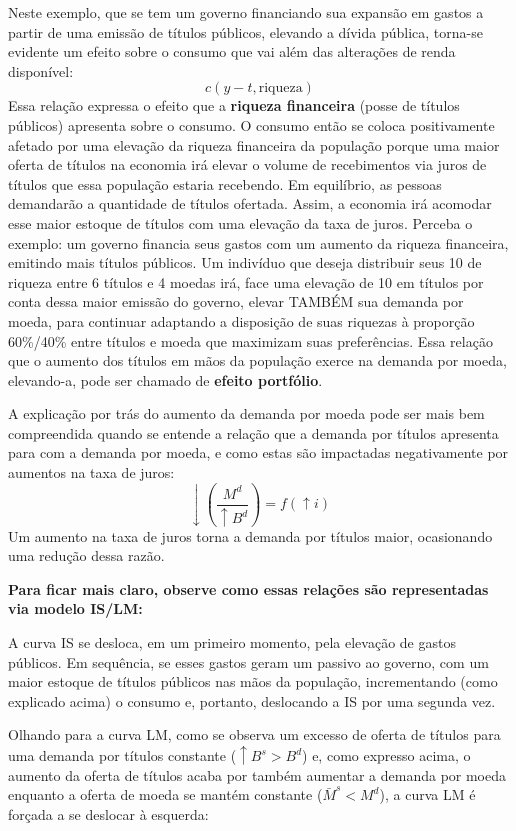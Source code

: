 \documentclass[a4paper,12pt]{article}[abntex2]
\begin{document}
Neste exemplo, que se tem um governo financiando sua expansão em gastos a partir de uma emissão de títulos públicos, elevando a dívida pública, torna-se evidente um efeito sobre o consumo que vai além das alterações de renda disponível:  
\[
c(y - t, \text{riqueza})
\]
Essa relação expressa o efeito que a \textbf{riqueza financeira} (posse de títulos públicos) apresenta sobre o consumo. O consumo então se coloca positivamente afetado por uma elevação da riqueza financeira da população porque uma maior oferta de títulos na economia irá elevar o volume  de  recebimentos  via  juros  de  títulos  que  essa  população  estaria  recebendo.  Em equilíbrio, as pessoas demandarão a quantidade de títulos ofertada. Assim, a economia irá acomodar esse maior estoque de títulos com uma elevação da taxa de juros. Perceba o exemplo: um governo financia seus gastos com um aumento da riqueza financeira, emitindo mais títulos públicos. Um indivíduo que deseja distribuir seus 10 de riqueza entre 6 títulos e 4 moedas irá, face uma elevação de 10 em títulos por conta dessa maior emissão do governo, elevar TAMBÉM sua demanda por moeda, para continuar adaptando a disposição de suas riquezas à proporção 60\%/40\% entre títulos e moeda que maximizam suas preferências. Essa relação que o aumento dos títulos em mãos da população exerce na demanda por moeda, elevando-a, pode ser chamado de \textbf{efeito portfólio}.

A explicação por trás do aumento da demanda por moeda pode ser mais bem compreendida quando se entende a relação que a demanda por títulos apresenta para com a demanda por moeda, e como estas são impactadas negativamente por aumentos na taxa de juros:
\[
\downarrow\left( \frac{M^d}{\uparrow B^d} \right) = f(\uparrow i)
\]
Um aumento na taxa de juros torna a demanda por títulos maior, ocasionando uma redução dessa razão. 

\textbf{Para ficar mais claro, observe como essas relações são representadas via modelo IS/LM:}

A curva IS se desloca, em um primeiro momento, pela elevação de gastos públicos. Em sequência, se esses gastos geram um passivo ao governo, com um maior estoque de títulos públicos nas mãos da população, incrementando (como explicado acima) o consumo e, portanto, deslocando a IS por uma segunda vez.

Olhando para a curva LM, como se observa um excesso de oferta de títulos para uma demanda por títulos constante ($\uparrow B^s > B^d$) e, como expresso acima, o aumento da oferta de títulos acaba por também aumentar a demanda por moeda enquanto a oferta de moeda se mantém constante ($\bar{M}^s < M^d$), a curva LM é forçada a se deslocar à esquerda:
\end{document}
